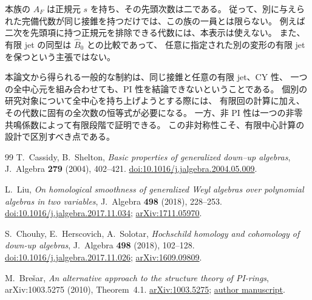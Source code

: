 本族の $A_F$ は正規元 $s$ を持ち、その先頭次数は二である。
従って、別に与えられた完備代数が同じ接錐を持つだけでは、この族の一員とは限らない。
例えば二次を先頭項に持つ正規元を排除できる代数には、本表示は使えない。
また、有限 jet の同型は $\widehat B_0$ との比較であって、
任意に指定された別の変形の有限 jet を保つという主張ではない。

本論文から得られる一般的な制約は、同じ接錐と任意の有限 jet、CY 性、
一つの全中心元を組み合わせても、PI 性を結論できないということである。
個別の研究対象について全中心を持ち上げようとする際には、
有限回の計算に加え、その代数に固有の全次数の恒等式が必要になる。
一方、非 PI 性は一つの非零共鳴係数によって有限段階で証明できる。
この非対称性こそ、有限中心計算の設計で区別すべき点である。


\begin{thebibliography}{99}
T.~Cassidy, B.~Shelton,
\emph{Basic properties of generalized down--up algebras},
J.~Algebra \textbf{279} (2004), 402--421.
\href{https://doi.org/10.1016/j.jalgebra.2004.05.009}{doi:10.1016/j.jalgebra.2004.05.009}.

L.~Liu,
\emph{On homological smoothness of generalized Weyl algebras over polynomial algebras in two variables},
J.~Algebra \textbf{498} (2018), 228--253.
\href{https://doi.org/10.1016/j.jalgebra.2017.11.034}{doi:10.1016/j.jalgebra.2017.11.034};
\href{https://arxiv.org/abs/1711.05970}{arXiv:1711.05970}.

S.~Chouhy, E.~Herscovich, A.~Solotar,
\emph{Hochschild homology and cohomology of down-up algebras},
J.~Algebra \textbf{498} (2018), 102--128.
\href{https://doi.org/10.1016/j.jalgebra.2017.11.026}{doi:10.1016/j.jalgebra.2017.11.026};
\href{https://arxiv.org/abs/1609.09809}{arXiv:1609.09809}.

M.~Bre\v{s}ar,
\emph{An alternative approach to the structure theory of PI-rings},
arXiv:1003.5275 (2010), Theorem~4.1.
\href{https://arxiv.org/abs/1003.5275}{arXiv:1003.5275};
\href{https://users.fmf.uni-lj.si/bresar/documents/PI.pdf}{author manuscript}.
\end{thebibliography}

